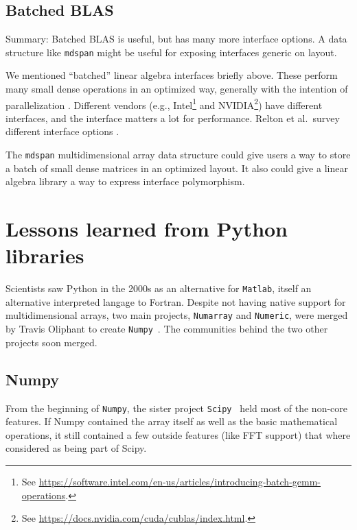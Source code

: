 \subsection{Batched BLAS}
\label{SS:other-standards:batched}

Summary: Batched BLAS is useful, but has many more interface options.
A data structure like \texttt{mdspan} \cite{P0009r8} might be useful
for exposing interfaces generic on layout.

We mentioned ``batched'' linear algebra interfaces briefly above.
These perform many small dense operations in an optimized way,
generally with the intention of parallelization
\cite{dongarra2016batched}.  Different vendors (e.g.,
Intel\footnote{See
  \url{https://software.intel.com/en-us/articles/introducing-batch-gemm-operations}.}
and NVIDIA\footnote{See
  \url{https://docs.nvidia.com/cuda/cublas/index.html}.}) have
different interfaces, and the interface matters a lot for performance.
Relton et al.\ survey different interface options
\cite{relton2016comparison}.

The \texttt{mdspan} \cite{P0009r8} multidimensional array data
structure could give users a way to store a batch of small dense
matrices in an optimized layout.  It also could give a linear algebra
library a way to express interface polymorphism.

\section{Lessons learned from Python libraries}
\label{S:Python}

Scientists saw Python in the 2000s as an alternative for \texttt{Matlab}, itself
 an alternative interpreted langage to Fortran. Despite not having native
  support for multidimensional arrays, two main projects, \texttt{Numarray} and
  \texttt{Numeric}, were merged by Travis Oliphant to create 
  \texttt{Numpy}~\cite{oliphant2006numpy}. The communities behind
  the two other projects soon merged.

\subsection{Numpy}
\label{S:Python:numpy}

From the beginning of \texttt{Numpy}, the sister project 
 \texttt{Scipy}~\cite{scipy2001} held most of the non-core features.
 If Numpy contained the array itself as well as the basic mathematical 
 operations, it still contained a few outside features (like FFT 
 support) that where considered as being part of Scipy.

